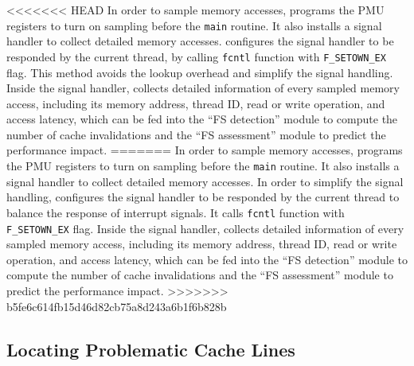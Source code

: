 <<<<<<< HEAD
In order to sample memory accesses, \cheetah{} programs the PMU registers to turn on sampling before the \texttt{main} routine. It also installs a signal handler to collect detailed memory accesses. \Cheetah{} configures the signal handler to be responded by the current thread, by calling \texttt{fcntl} function with \texttt{F\_SETOWN\_EX} flag. This method avoids the lookup overhead and  simplify the signal handling. Inside the signal handler, \Cheetah{} collects detailed information of every sampled memory access, including its memory address, thread ID, read or write operation, and access latency, which can be fed into the ``FS detection'' module to compute the number of cache invalidations and the ``FS assessment'' module to predict the performance impact.
=======
In order to sample memory accesses, \cheetah{} programs the PMU registers to turn on sampling before the \texttt{main} routine. It also installs a signal handler to collect detailed memory accesses. In order to simplify the signal handling, \Cheetah{} configures the signal handler to be responded by the current thread to balance the response of interrupt signals. It calls \texttt{fcntl} function with \texttt{F\_SETOWN\_EX} flag. Inside the signal handler, \Cheetah{} collects detailed information of every sampled memory access, including its memory address, thread ID, read or write operation, and access latency, which can be fed into the ``FS detection'' module to compute the number of cache invalidations and the ``FS assessment'' module to predict the performance impact.
>>>>>>> b5fe6c614fb15d46d82cb75a8d243a6b1f6b828b

\subsection{Locating Problematic Cache Lines}
\label{sec:shadow}

